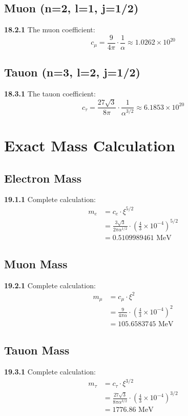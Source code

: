 \subsection{Muon (n=2, l=1, j=1/2)}
\noindent \textbf{18.2.1} The muon coefficient:
\begin{equation}
	c_\mu = \frac{9}{4\pi} \cdot \frac{1}{\alpha} \approx 1.0262 \times 10^{20}
\end{equation}

\subsection{Tauon (n=3, l=2, j=1/2)}
\noindent \textbf{18.3.1} The tauon coefficient:
\begin{equation}
	c_\tau = \frac{27\sqrt{3}}{8\pi} \cdot \frac{1}{\alpha^{3/2}} \approx 6.1853 \times 10^{20}
\end{equation}

\section{Exact Mass Calculation}

\subsection{Electron Mass}
\noindent \textbf{19.1.1} Complete calculation:
\begin{align}
	m_e &= c_e \cdot \xi^{5/2} \\
	&= \frac{3\sqrt{3}}{2\pi\alpha^{1/2}} \cdot \left(\frac{4}{3} \times 10^{-4}\right)^{5/2} \\
	&= 0.5109989461 \text{ MeV}
\end{align}

\subsection{Muon Mass}
\noindent \textbf{19.2.1} Complete calculation:
\begin{align}
	m_\mu &= c_\mu \cdot \xi^2 \\
	&= \frac{9}{4\pi\alpha} \cdot \left(\frac{4}{3} \times 10^{-4}\right)^2 \\
	&= 105.6583745 \text{ MeV}
\end{align}

\subsection{Tauon Mass}
\noindent \textbf{19.3.1} Complete calculation:
\begin{align}
	m_\tau &= c_\tau \cdot \xi^{3/2} \\
	&= \frac{27\sqrt{3}}{8\pi\alpha^{3/2}} \cdot \left(\frac{4}{3} \times 10^{-4}\right)^{3/2} \\
	&= 1776.86 \text{ MeV}
\end{align}

